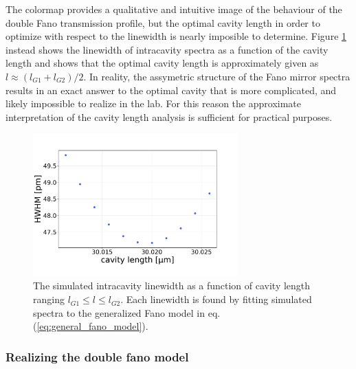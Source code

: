 The colormap provides a qualitative and intuitive image of the behaviour of the double Fano transmission profile, but the optimal cavity length in order to optimize with respect to the linewidth is nearly imposible to determine. Figure \ref{fig:G1/G2_lw_vs_cavity_length} instead shows the linewidth of intracavity spectra as a function of the cavity length and shows that the optimal cavity length is approximately given as $l \approx (l_{G1} + l_{G2})/2$. In reality, the assymetric structure of the Fano mirror spectra results in an exact answer to the optimal cavity that is more complicated, and likely impossible to realize in the lab. For this reason the approximate interpretation of the cavity length analysis is sufficient for practical purposes.

\begin{figure}[h!]
    \centering
    \includegraphics[width=0.7\textwidth]{figures/results/M3:M5/M3:M5_lw_vs_length.pdf}
    \caption{The simulated intracavity linewidth as a function of cavity length ranging $l_{G1} \leq l \leq l_{G2}$. Each linewidth is found by fitting simulated spectra to the generalized Fano model in eq. (\ref{eq:general_fano_model}).}
    \label{fig:G1/G2_lw_vs_cavity_length}
\end{figure}

\clearpage
\subsubsection{Realizing the double fano model}\label{sec:realizing_the_double_fano_model}


